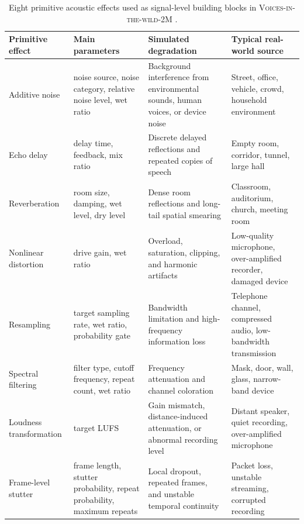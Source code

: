 \documentclass{llmxive}
\providecommand{\arraystretch}{1.05}
\begin{document}
\begin{table}[t]
\centering
\small
\setlength{\tabcolsep}{4pt}
\renewcommand{\arraystretch}{1.15}
\begin{tabular}{p{} p{} p{} p{}}
\toprule
\textbf{Primitive effect} & \textbf{Main parameters} & \textbf{Simulated degradation} & \textbf{Typical real-world source} \\
\midrule
Additive noise
& noise source, noise category, relative noise level, wet ratio
& Background interference from environmental sounds, human voices, or device noise
& Street, office, vehicle, crowd, household environment \\

Echo delay
& delay time, feedback, mix ratio
& Discrete delayed reflections and repeated copies of speech
& Empty room, corridor, tunnel, large hall \\

Reverberation
& room size, damping, wet level, dry level
& Dense room reflections and long-tail spatial smearing
& Classroom, auditorium, church, meeting room \\

Nonlinear distortion
& drive gain, wet ratio
& Overload, saturation, clipping, and harmonic artifacts
& Low-quality microphone, over-amplified recorder, damaged device \\

Resampling
& target sampling rate, wet ratio, probability gate
& Bandwidth limitation and high-frequency information loss
& Telephone channel, compressed audio, low-bandwidth transmission \\

Spectral filtering
& filter type, cutoff frequency, repeat count, wet ratio
& Frequency attenuation and channel coloration
& Mask, door, wall, glass, narrow-band device \\

Loudness transformation
& target LUFS
& Gain mismatch, distance-induced attenuation, or abnormal recording level
& Distant speaker, quiet recording, over-amplified microphone \\

Frame-level stutter
& frame length, stutter probability, repeat probability, maximum repeats
& Local dropout, repeated frames, and unstable temporal continuity
& Packet loss, unstable streaming, corrupted recording \\
\bottomrule
\end{tabular}
\caption{Eight primitive acoustic effects used as signal-level building blocks in  \textsc{Voices-in-the-wild-2M} .}
\label{tab:primitive_effects}
\end{table}
\end{document}
